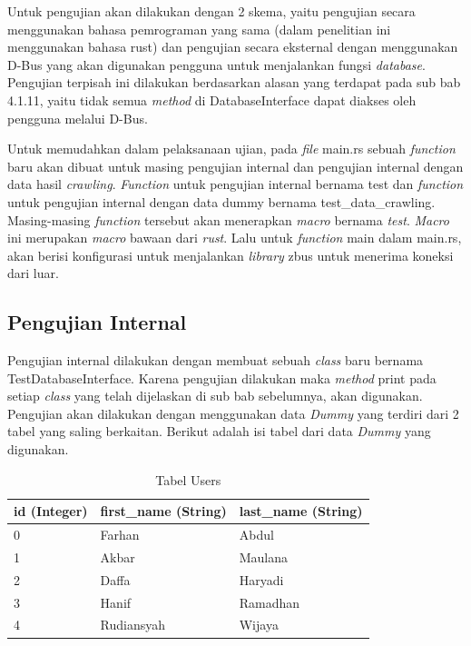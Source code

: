 Untuk pengujian akan dilakukan dengan 2 skema, yaitu pengujian secara  menggunakan bahasa pemrograman yang sama 
(dalam penelitian ini menggunakan bahasa rust) dan pengujian secara eksternal dengan menggunakan D-Bus yang akan digunakan pengguna
untuk menjalankan fungsi \emph{database}. Pengujian terpisah ini dilakukan berdasarkan alasan yang terdapat pada sub bab 4.1.11, yaitu tidak semua \emph{method} di 
DatabaseInterface dapat diakses oleh pengguna melalui D-Bus. 

Untuk memudahkan dalam pelaksanaan ujian, pada \emph{file} main.rs sebuah \emph{function} baru akan dibuat untuk
masing pengujian internal dan pengujian internal dengan data hasil \emph{crawling}. \emph{Function} untuk pengujian internal bernama test dan \emph{function} untuk pengujian internal
dengan data dummy bernama test\_data\_crawling. Masing-masing \emph{function} tersebut akan menerapkan \emph{macro} bernama \emph{test}. \emph{Macro} ini merupakan \emph{macro}
bawaan dari \emph{rust}. Lalu untuk \emph{function} main dalam main.rs, akan berisi konfigurasi untuk menjalankan \emph{library} zbus untuk menerima koneksi dari luar.

\subsection{Pengujian Internal}
Pengujian internal dilakukan dengan membuat sebuah \emph{class} baru bernama TestDatabaseInterface. Karena pengujian dilakukan  maka \emph{method} print 
pada setiap \emph{class} yang telah dijelaskan di sub bab sebelumnya, akan digunakan. Pengujian akan dilakukan dengan menggunakan data \emph{Dummy} yang terdiri dari 
2 tabel yang saling berkaitan. Berikut adalah isi tabel dari data \emph{Dummy} yang digunakan. 

\begin{table}[H]
  \centering{}
  \begin{tabular}{|m{2.5cm}|m{4cm}|m{4cm}|}
      \hline
      \textbf{id (Integer)} & \textbf{first\_name (String)} &  \textbf{last\_name (String)} \\
      \hline
      0 & Farhan & Abdul \\
      \hline
      1 & Akbar & Maulana \\
      \hline
      2 & Daffa & Haryadi \\
      \hline
      3 & Hanif & Ramadhan \\
      \hline
      4 & Rudiansyah & Wijaya \\
      \hline
  \end{tabular}
  \caption{Tabel Users}
\end{table}


